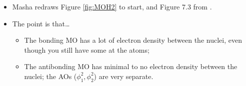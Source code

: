 \documentclass[../notes.tex]{subfiles}
\begin{document}
\begin{itemize}
    \begin{itemize}
        \item Masha redraws Figure \ref{fig:MOH2} to start, and Figure 7.3 from \textcite{bib:CHEM26100Notes}.
        \item The point is that\dots
        \begin{itemize}
            \item The bonding MO has a lot of electron density between the nuclei, even though you still have some at the atoms;
            \item The antibonding MO has minimal to no electron density between the nuclei; the AOs ($\phi_1^2,\phi_2^2$) are very separate.
        \end{itemize}
    \end{itemize}
\end{itemize}
\end{document}
